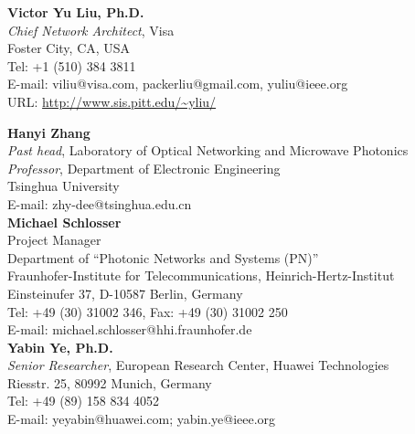 \documentclass[letterpaper,11pt]{article}
\begin{document}
\begin{CJK}{UTF8}{gbsn}
\vspace{0.2in}%
\textbf{Victor Yu Liu, Ph.D.}\\
\textit{Chief Network Architect}, Visa\\
Foster City, CA, USA\\
Tel: +1 (510) 384 3811\\
E-mail: viliu@visa.com, packerliu@gmail.com, yuliu@ieee.org\\
URL: \url{http://www.sis.pitt.edu/~yliu/}


\vspace{0.2in}%
\textbf{Hanyi Zhang}\\
\textit{Past head}, Laboratory of Optical Networking and Microwave
Photonics\\
\textit{Professor}, Department of Electronic Engineering\\
Tsinghua University\\
E-mail: zhy-dee@tsinghua.edu.cn\\


\vspace{0.2in}%
\textbf{Michael Schlosser}\\
Project Manager\\
Department of ``Photonic Networks and Systems (PN)''\\
Fraunhofer-Institute for Telecommunications, Heinrich-Hertz-Institut\\
Einsteinufer 37, D-10587 Berlin, Germany\\
Tel: +49 (30) 31002 346, Fax: +49 (30) 31002 250\\
E-mail: michael.schlosser@hhi.fraunhofer.de\\ %


\vspace{0.2in}%
\textbf{Yabin Ye, Ph.D.}\\
\textit{Senior Researcher}, European Research Center, Huawei Technologies\\
Riesstr. 25, 80992 Munich, Germany\\
Tel: +49 (89) 158 834 4052\\
E-mail: yeyabin@huawei.com; yabin.ye@ieee.org\\



\end{CJK}
\end{document}
